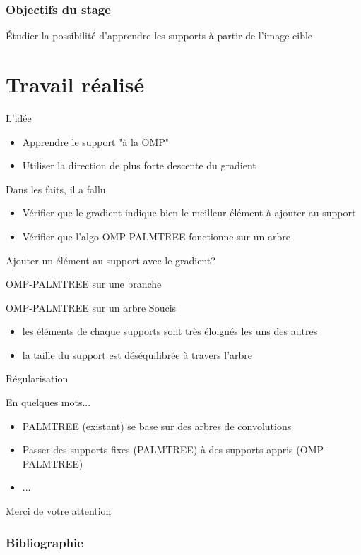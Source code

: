 \begin{frame}
	\frametitle{Objectifs du stage}
	Étudier la possibilité d'apprendre les supports à partir de l'image cible
\end{frame}


\section{Travail réalisé}

\begin{frame}{L'idée}
\begin{itemize}
	\item Apprendre le support "à la OMP"
	\item Utiliser la direction de plus forte descente du gradient
\end{itemize}
Dans les faits, il a fallu
\begin{itemize}
	\item Vérifier que le gradient indique bien le meilleur élément à ajouter au support
	\item Vérifier que l'algo OMP-PALMTREE fonctionne sur un arbre
\end{itemize}
\end{frame}


\begin{frame}{Ajouter un élément au support avec le gradient?}
\end{frame}


\begin{frame}{OMP-PALMTREE sur une branche}
\end{frame}


\begin{frame}{OMP-PALMTREE sur un arbre}
Soucis
\begin{itemize}
	\item les éléments de chaque supports sont très éloignés les uns des autres
	\item la taille du support est déséquilibrée à travers l'arbre
\end{itemize}
\end{frame}


\begin{frame}{Régularisation}
\end{frame}


\begin{frame}{En quelques mots...}
\begin{itemize}
\item PALMTREE (existant) se base sur des arbres de convolutions
\item Passer des supports fixes (PALMTREE) à des supports appris (OMP-PALMTREE)
\item ...
\end{itemize}
\vfill
\hfill Merci de votre attention
\end{frame}

\appendix

\begin{frame}
\frametitle{Bibliographie}
\printbibliography[heading=none]
\end{frame}



